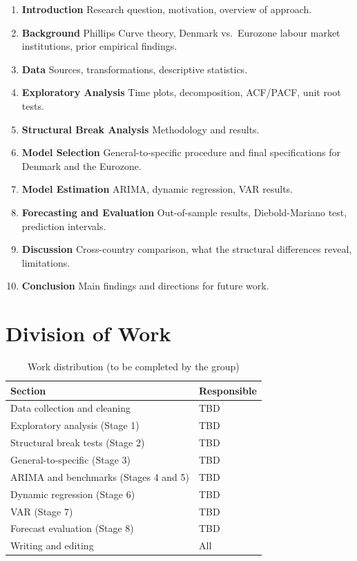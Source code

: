 \begin{enumerate}[nosep]
    \item \textbf{Introduction} Research question, motivation, overview of
          approach.
    \item \textbf{Background} Phillips Curve theory, Denmark vs.\ Eurozone
          labour market institutions, prior empirical findings.
    \item \textbf{Data} Sources, transformations, descriptive statistics.
    \item \textbf{Exploratory Analysis} Time plots, decomposition, ACF/PACF,
          unit root tests.
    \item \textbf{Structural Break Analysis} Methodology and results.
    \item \textbf{Model Selection} General-to-specific procedure and final
          specifications for Denmark and the Eurozone.
    \item \textbf{Model Estimation} ARIMA, dynamic regression, VAR results.
    \item \textbf{Forecasting and Evaluation} Out-of-sample results,
          Diebold-Mariano test, prediction intervals.
    \item \textbf{Discussion} Cross-country comparison, what the structural
          differences reveal, limitations.
    \item \textbf{Conclusion} Main findings and directions for future work.
\end{enumerate}

\section{Division of Work}

\begin{table}[h!]
\centering
\begin{tabular}{ll}
\toprule
\textbf{Section} & \textbf{Responsible} \\
\midrule
Data collection and cleaning & TBD \\
Exploratory analysis (Stage 1) & TBD \\
Structural break tests (Stage 2) & TBD \\
General-to-specific (Stage 3) & TBD \\
ARIMA and benchmarks (Stages 4 and 5) & TBD \\
Dynamic regression (Stage 6) & TBD \\
VAR (Stage 7) & TBD \\
Forecast evaluation (Stage 8) & TBD \\
Writing and editing & All \\
\bottomrule
\end{tabular}
\caption{Work distribution (to be completed by the group)}
\end{table}

